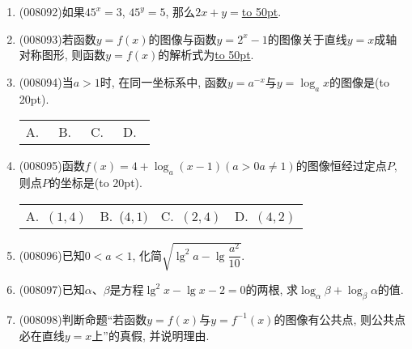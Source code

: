 \documentclass[10pt,a4paper]{article}
\newcommand{\blank}[1]{\underline{\hbox to #1pt{}}}
\newcommand{\bracket}[1]{(\hbox to #1pt{})}
\newcommand{\fourch}[4]{\par\begin{tabular}{p{.23\textwidth}p{.23\textwidth}p{.23\textwidth}p{.23\textwidth}}
A.~#1 &B.~#2& C.~#3& D.~#4
\end{tabular}}
\begin{document}
\begin{enumerate}[1.]
\item {\tiny (008092)}如果$45^x=3$, $45^y=5$, 那么$2x+y=$\blank{50}.
\item {\tiny (008093)}若函数$y=f(x)$的图像与函数$y=2^x-1$的图像关于直线$y=x$成轴对称图形, 则函数$y=f(x)$的解析式为\blank{50}.
\item {\tiny (008094)}当$a>1$时, 在同一坐标系中, 函数$y=a^{-x}$与$y=\log _ax$的图像是\bracket{20}.
\fourch{\begin{tikzpicture}[scale = 0.7, >=latex]
    \draw [->] (-2,0) -- (2,0) node [below] {$x$};
    \draw [->] (0,-2) -- (0,2) node [left] {$y$};
    \draw (0,0) node [below left] {$O$};
    \draw [domain = -1:2] plot (\x, {pow(0.5,\x)});
    \draw [domain = -1:2] plot ({pow(0.5,\x)},-\x);
\end{tikzpicture}}
{\begin{tikzpicture}[scale = 0.7, >=latex]
    \draw [->] (-2,0) -- (2,0) node [below] {$x$};
    \draw [->] (0,-2) -- (0,2) node [left] {$y$};
    \draw (0,0) node [below left] {$O$};
    \draw [domain = -1:2] plot (-\x, {pow(0.5,\x)});
    \draw [domain = -1:2] plot ({pow(0.5,\x)},-\x);
\end{tikzpicture}}{\begin{tikzpicture}[scale = 0.7, >=latex]
    \draw [->] (-2,0) -- (2,0) node [below] {$x$};
    \draw [->] (0,-2) -- (0,2) node [left] {$y$};
    \draw (0,0) node [below left] {$O$};
    \draw [domain = -1:2] plot (-\x, {pow(0.5,\x)});
    \draw [domain = -1:2] plot ({pow(0.5,\x)},\x);
\end{tikzpicture}}{\begin{tikzpicture}[scale = 0.7, >=latex]
    \draw [->] (-2,0) -- (2,0) node [below] {$x$};
    \draw [->] (0,-2) -- (0,2) node [left] {$y$};
    \draw (0,0) node [below left] {$O$};
    \draw [domain = -1:2] plot (\x, {pow(0.5,\x)});
    \draw [domain = -1:2] plot ({pow(0.5,\x)},\x);
\end{tikzpicture}}
\item {\tiny (008095)}函数$f(x)=4+\log _a(x-1)(a>0a\ne 1)$的图像恒经过定点$P$, 则点$P$的坐标是\bracket{20}.
\fourch{$(1, 4)$}{($4, 1)$}{$(2, 4)$}{$(4, 2)$}
\item {\tiny (008096)}已知$0<a<1$, 化简$\sqrt {\lg ^2a-\lg \dfrac{a^2}{10}}$.
\item {\tiny (008097)}已知$\alpha$、$\beta$是方程$\lg ^2x-\lg x-2=0$的两根, 求$\log _{\alpha }\beta +\log _{\beta }\alpha$的值.
\item {\tiny (008098)}判断命题``若函数$y=f(x)$与$y=f^{-1}(x)$的图像有公共点, 则公共点必在直线$y=x$上''的真假, 并说明理由.

\end{enumerate}
\end{document}
